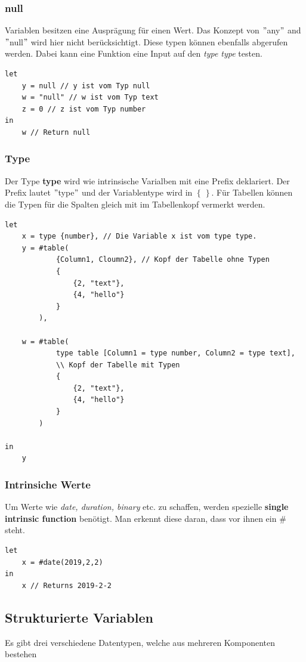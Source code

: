 \subsubsection{null}
Variablen besitzen eine Ausprägung für einen Wert. Das Konzept von $"$any$"$ and $"$null$"$ wird hier nicht berücksichtigt. Diese typen können ebenfalls abgerufen werden. Dabei kann eine Funktion eine Input auf den \textit{type type} testen. 


\begin{lstlisting}[style=M]
let
	y = null // y ist vom Typ null
	w = "null" // w ist vom Typ text
	z = 0 // z ist vom Typ number
in 
	w // Return null
\end{lstlisting}

\subsubsection{Type}
Der Type \textbf{type} wird wie intrinsische Varialben mit eine Prefix deklariert. Der Prefix lautet $"$type$"$ und der Variablentype wird in $\left\lbrace \, \right\rbrace$. Für Tabellen können die Typen für die Spalten gleich mit im Tabellenkopf vermerkt werden.
\begin{lstlisting}[style=M]
let 
	x = type {number}, // Die Variable x ist vom type type.
	y = #table(
			{Column1, Cloumn2}, // Kopf der Tabelle ohne Typen
			{
				{2, "text"},
				{4, "hello"}
			}
		),

	w = #table(
			type table [Column1 = type number, Column2 = type text], 
			\\ Kopf der Tabelle mit Typen 
			{
				{2, "text"},
				{4, "hello"}
			}
		)

in
	y 
\end{lstlisting} 
\subsubsection{Intrinsiche Werte}
Um Werte wie \textit{date, duration, binary} etc. zu schaffen, werden spezielle \textbf{single intrinsic function} benötigt. Man erkennt diese daran, dass vor ihnen ein $\#$ steht. 

\begin{lstlisting}[style=M]
let
	x = #date(2019,2,2)
in
	x // Returns 2019-2-2
\end{lstlisting} 

\subsection{Strukturierte Variablen} 
Es gibt drei verschiedene Datentypen, welche aus mehreren Komponenten bestehen

